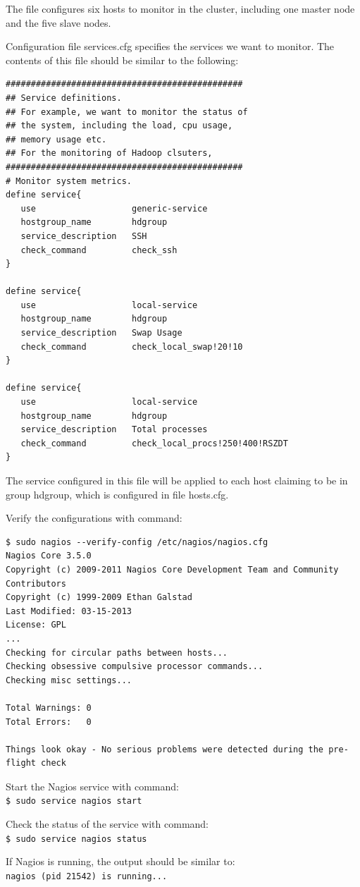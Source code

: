 The file configures six hosts to monitor in the cluster, including one master node and the five slave nodes.

Configuration file services.cfg specifies the services we want to monitor. The contents of this file should be similar to the following: 
\begin{verbatim}
###############################################
## Service definitions.
## For example, we want to monitor the status of
## the system, including the load, cpu usage,
## memory usage etc.
## For the monitoring of Hadoop clsuters,
###############################################
# Monitor system metrics.
define service{
   use                   generic-service
   hostgroup_name        hdgroup
   service_description   SSH
   check_command         check_ssh
}

define service{
   use                   local-service
   hostgroup_name        hdgroup
   service_description   Swap Usage
   check_command         check_local_swap!20!10
}

define service{
   use                   local-service
   hostgroup_name        hdgroup
   service_description   Total processes
   check_command         check_local_procs!250!400!RSZDT
}
\end{verbatim}

The service configured in this file will be applied to each host claiming to be in group hdgroup, which is configured in file hosts.cfg.


Verify the configurations with command: 
\begin{verbatim}
$ sudo nagios --verify-config /etc/nagios/nagios.cfg
Nagios Core 3.5.0
Copyright (c) 2009-2011 Nagios Core Development Team and Community Contributors
Copyright (c) 1999-2009 Ethan Galstad
Last Modified: 03-15-2013
License: GPL
...
Checking for circular paths between hosts...
Checking obsessive compulsive processor commands...
Checking misc settings...

Total Warnings: 0
Total Errors:   0

Things look okay - No serious problems were detected during the pre-flight check
\end{verbatim}

Start the Nagios service with command: \\
\verb|$ sudo service nagios start|

Check the status of the service with command: \\
\verb|$ sudo service nagios status|

If Nagios is running, the output should be similar to:\\
\verb|nagios (pid 21542) is running...|

